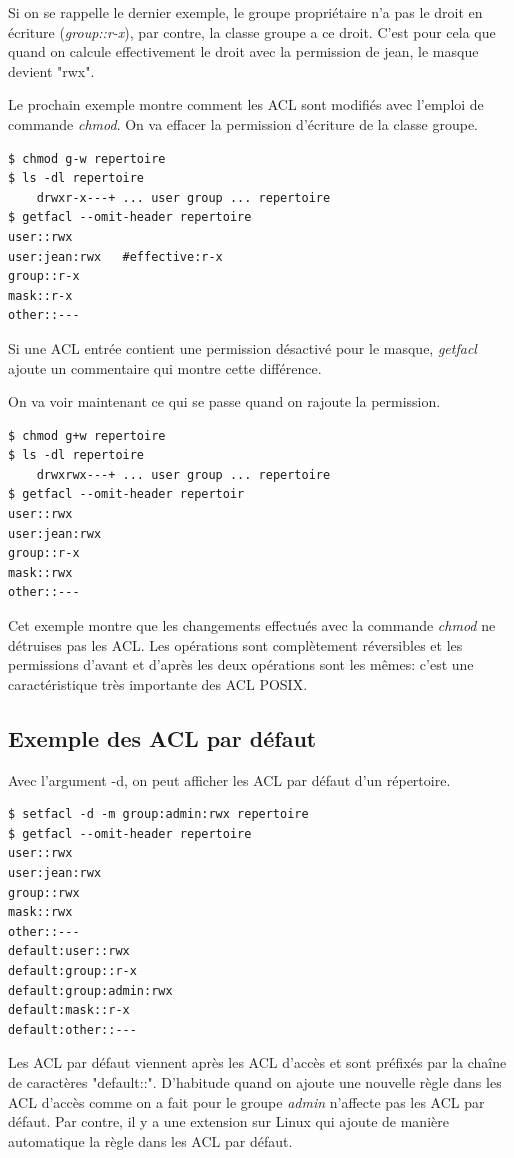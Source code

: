 \documentclass{article}
\begin{document}
Si on se rappelle le dernier exemple, le groupe propriétaire n'a pas le droit en écriture (\emph{group::r-x}), par contre, la classe groupe a ce droit. C'est pour cela que quand on calcule effectivement le droit avec la permission de jean, le masque devient "rwx".

Le prochain exemple montre comment les ACL sont modifiés avec l'emploi de commande \emph{chmod}. On va effacer la permission d'écriture de la classe groupe.

\begin{verbatim}
$ chmod g-w repertoire 
$ ls -dl repertoire 
	drwxr-x---+ ... user group ... repertoire 
$ getfacl --omit-header repertoire 
user::rwx 
user:jean:rwx 	#effective:r-x
group::r-x 	
mask::r-x 
other::---

\end{verbatim}

Si une ACL entrée contient une permission désactivé pour le masque, \emph{getfacl} ajoute un commentaire qui montre cette différence.

On va voir maintenant ce qui se passe quand on rajoute la permission. 

\begin{verbatim}
$ chmod g+w repertoire 
$ ls -dl repertoire 
	drwxrwx---+ ... user group ... repertoire 
$ getfacl --omit-header repertoir 
user::rwx 
user:jean:rwx 
group::r-x
mask::rwx
other::---
\end{verbatim}

Cet exemple montre que les changements effectués avec la commande \emph{chmod} ne détruises pas les ACL. Les opérations sont complètement réversibles et les permissions d'avant et d'après les deux opérations sont les mêmes: c'est une caractéristique très importante des ACL POSIX. 

\subsection*{Exemple des ACL par défaut}

Avec l'argument -d, on peut afficher les ACL par défaut d'un répertoire. 

\begin{verbatim}
$ setfacl -d -m group:admin:rwx repertoire 
$ getfacl --omit-header repertoire 
user::rwx
user:jean:rwx
group::rwx 
mask::rwx
other::---
default:user::rwx
default:group::r-x
default:group:admin:rwx
default:mask::r-x
default:other::---
\end{verbatim} 

Les ACL par défaut viennent après les ACL d'accès et sont préfixés par la chaîne de caractères "default::". D'habitude quand on ajoute une nouvelle règle dans les ACL d'accès comme on a fait pour le groupe \emph{admin} n'affecte pas les ACL par défaut. Par contre, il y a une extension sur Linux qui ajoute de manière automatique la règle dans les ACL par défaut. 
\end{document}
